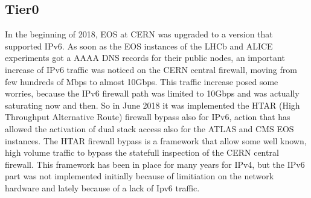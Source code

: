 \subsection{Tier0}
In the beginning of 2018, EOS at CERN was upgraded to a version that supported IPv6. 
As soon as the EOS instances of the LHCb and ALICE experiments got a AAAA DNS records for their public nodes, an important increase of IPv6 traffic was noticed on the CERN central firewall, moving from few hundreds of Mbps to almost 10Gbps.
This traffic increase posed some worries, because the IPv6 firewall path was limited to 10Gbps and was actually saturating now and then. So in June 2018 it was implemented the HTAR (High Throughput Alternative Route) firewall bypass also for IPv6, action that has allowed the activation of dual stack access also for the ATLAS and CMS EOS instances.
The HTAR firewall bypass is a framework that allow some well known, high volume traffic to bypass the statefull inspection of the CERN central firewall. This framework has been in place for many years for IPv4, but the IPv6 part was not implemented initially because of limitiation on the network hardware and lately because of a lack of Ipv6 traffic.

